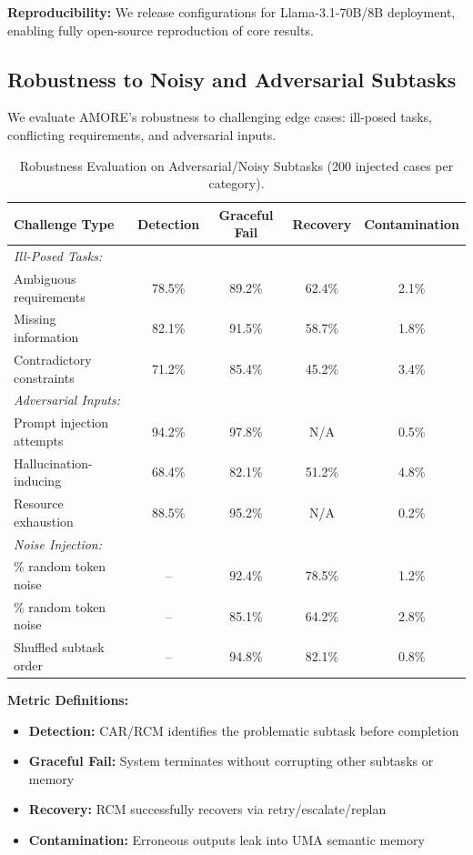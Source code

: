 \documentclass{article}
\theoremstyle{plain}
\theoremstyle{definition}
\theoremstyle{remark}
\begin{document}
\textbf{Reproducibility:} We release configurations for Llama-3.1-70B/8B deployment, enabling fully open-source reproduction of core results.

\subsection{Robustness to Noisy and Adversarial Subtasks}
\label{sec:robustness_adversarial}

We evaluate AMORE's robustness to challenging edge cases: ill-posed tasks, conflicting requirements, and adversarial inputs.

\begin{table}[h]
	\caption{Robustness Evaluation on Adversarial/Noisy Subtasks (200 injected cases per category).}
	\label{tab:robustness}
	\centering
	\small
	\begin{tabular}{@{}lcccc@{}}
		\toprule
		\textbf{Challenge Type} & \textbf{Detection} & \textbf{Graceful Fail} & \textbf{Recovery} & \textbf{Contamination} \\
		\midrule
		\multicolumn{5}{l}{\textit{Ill-Posed Tasks:}} \\
		\quad Ambiguous requirements & 78.5\% & 89.2\% & 62.4\% & 2.1\% \\
		\quad Missing information & 82.1\% & 91.5\% & 58.7\% & 1.8\% \\
		\quad Contradictory constraints & 71.2\% & 85.4\% & 45.2\% & 3.4\% \\
		\midrule
		\multicolumn{5}{l}{\textit{Adversarial Inputs:}} \\
		\quad Prompt injection attempts & 94.2\% & 97.8\% & N/A & 0.5\% \\
		\quad Hallucination-inducing & 68.4\% & 82.1\% & 51.2\% & 4.8\% \\
		\quad Resource exhaustion & 88.5\% & 95.2\% & N/A & 0.2\% \\
		\midrule
		\multicolumn{5}{l}{\textit{Noise Injection:}} \\
		\quad 10\% random token noise & -- & 92.4\% & 78.5\% & 1.2\% \\
		\quad 20\% random token noise & -- & 85.1\% & 64.2\% & 2.8\% \\
		\quad Shuffled subtask order & -- & 94.8\% & 82.1\% & 0.8\% \\
		\bottomrule
	\end{tabular}
\end{table}

\textbf{Metric Definitions:}
\begin{itemize}[nosep,leftmargin=*]
	\item \textbf{Detection:} CAR/RCM identifies the problematic subtask before completion
	\item \textbf{Graceful Fail:} System terminates without corrupting other subtasks or memory
	\item \textbf{Recovery:} RCM successfully recovers via retry/escalate/replan
	\item \textbf{Contamination:} Erroneous outputs leak into UMA semantic memory
\end{itemize}
\end{document}
